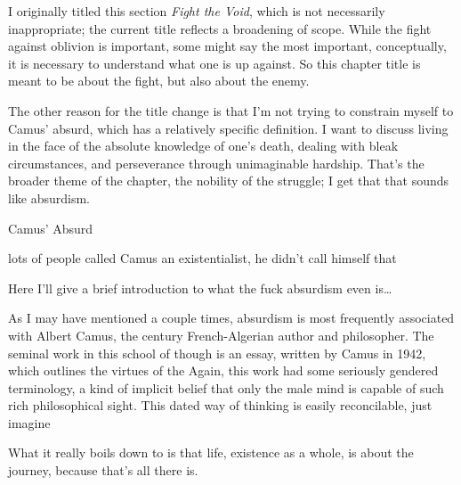 \documentclass[../butidigress.tex]{subfiles}
\begin{document}
I originally titled this section \textit{Fight the Void}, which is not necessarily inappropriate; the current title reflects a broadening of scope.
While the fight against oblivion is important, some might say the most important, conceptually, it is necessary to understand what one is up against.
So this chapter title is meant to be about the fight, but also about the enemy.

The other reason for the title change is that I'm not trying to constrain myself to Camus' absurd, which has a relatively specific definition.
I want to discuss living in the face of the absolute knowledge of one's death, dealing with bleak circumstances, and perseverance through unimaginable hardship.
That's the broader theme of the chapter, the nobility of the struggle; I get that that sounds like absurdism.


\begin{somenotes}{Camus' Absurd}
    \item lots of people called Camus an existentialist, he didn't call himself that
\end{somenotes}

Here I'll give a brief introduction to what the fuck absurdism even is\ldots{}

As I may have mentioned a couple times, absurdism is most frequently associated with Albert Camus, the  century French-Algerian author and philosopher.
The seminal work in this school of though is  an essay, written by Camus in 1942, which outlines the virtues of the 
Again, this work had some seriously gendered terminology, a kind of implicit belief that only the male mind is capable of such rich philosophical sight.
This dated way of thinking is easily reconcilable, just imagine 

What it really boils down to is that life, existence as a whole, is about the journey, because that's all there is.\autocite{mythofsisyphus}
\end{document}
